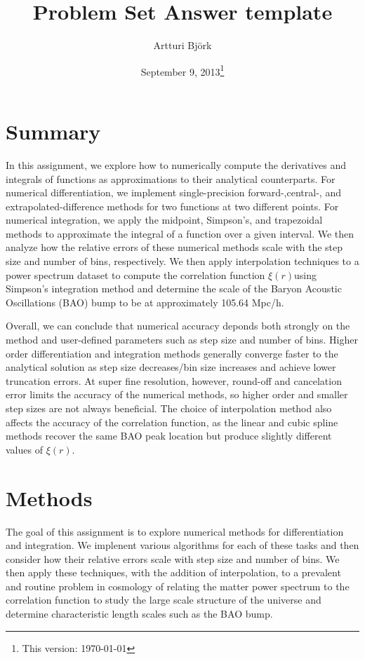 \documentclass[a4paper,11pt]{article}
\title{Problem Set Answer template}
\author{Artturi Björk}
\affil{Department of Economics \\\ Aalto University School of Business, Helsinki, Finland}
\date{September 9, 2013\thanks{This version: \today}} %
\begin{document}
\section*{Summary}

In this assignment, we explore how to numerically compute the derivatives and integrals of functions as approximations to their analytical counterparts. For numerical differentiation, we implement single-precision forward-,central-, and extrapolated-difference methods for two functions at two different points. For numerical integration, we apply the midpoint, Simpson's, and trapezoidal methods to approximate the integral of a function over a given interval. We then analyze how the relative errors of these numerical methods scale with the step size and number of bins, respectively. We then apply interpolation techniques to a power spectrum dataset to compute the correlation function $\xi(r)$using Simpson's integration method and determine the scale of the Baryon Acoustic Oscillations (BAO) bump to be at approximately 105.64 Mpc/h.

Overall, we can conclude that numerical accuracy deponds both strongly on the method and user-defined parameters such as step size and number of bins. Higher order differentiation and integration methods generally converge faster to the analytical solution as step size decreases/bin size increases and achieve lower truncation errors. At super fine resolution, however, round-off and cancelation error limits the accuracy of the numerical methods, so higher order and smaller step sizes are not always beneficial. The choice of interpolation method also affects the accuracy of the correlation function, as the linear and cubic spline methods recover the same BAO peak location but produce slightly different values of $\xi(r)$.

\section*{Methods}

The goal of this assignment is to explore numerical methods for differentiation and integration. We implenent various algorithms for each of these tasks and then consider how their relative errors scale with step size and number of bins. We then apply these techniques, with the addition of interpolation, to a prevalent and routine problem in cosmology of relating the matter power spectrum to the correlation function to study the large scale structure of the universe and determine characteristic length scales such as the BAO bump.
\end{document}
